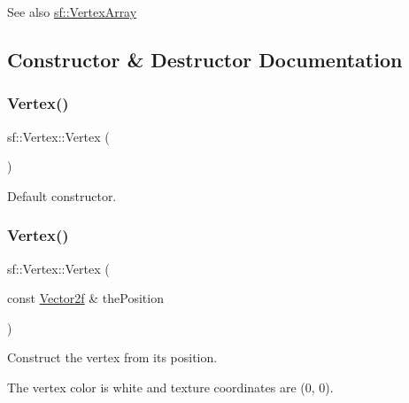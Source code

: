 \begin{DoxySeeAlso}{See also}
\mbox{\hyperlink{classsf_1_1_vertex_array}{sf\+::\+Vertex\+Array}} \begin{DoxyVerb}\end{DoxyVerb}
 
\end{DoxySeeAlso}


\subsection{Constructor \& Destructor Documentation}
\mbox{\label{classsf_1_1_vertex_a6b4c79cd69f7ec1296fede536f39e9c8}} 
\subsubsection{\texorpdfstring{Vertex()}{Vertex()}\hspace{0.1cm}{\footnotesize\ttfamily [1/5]}}
{\footnotesize\ttfamily sf\+::\+Vertex\+::\+Vertex (\begin{DoxyParamCaption}{ }\end{DoxyParamCaption})}



Default constructor. 

\begin{DoxyVerb}\end{DoxyVerb}
 \mbox{\label{classsf_1_1_vertex_a4dccc5c351b73b6fac169fe442535b40}} 
\subsubsection{\texorpdfstring{Vertex()}{Vertex()}\hspace{0.1cm}{\footnotesize\ttfamily [2/5]}}
{\footnotesize\ttfamily sf\+::\+Vertex\+::\+Vertex (\begin{DoxyParamCaption}\item[{const \mbox{\hyperlink{classsf_1_1_vector2}{Vector2f}} \&}]{the\+Position }\end{DoxyParamCaption})}



Construct the vertex from its position. 

The vertex color is white and texture coordinates are (0, 0).



